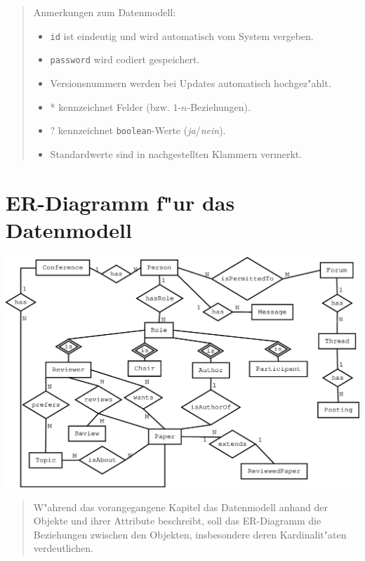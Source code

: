 \documentclass[a4paper, 12pt]{scrartcl}
\begin{document}
    \begin{quote}
        Anmerkungen zum Datenmodell:
        \begin{itemize}
            \item \texttt{id} ist eindeutig und wird automatisch vom System vergeben.
            \item \texttt{password} wird codiert gespeichert.
            \item Versionsnummern werden bei Updates automatisch hochgez"ahlt.
            \item * kennzeichnet Felder (bzw. $1$-$n$-Beziehungen).
            \item ? kennzeichnet \texttt{boolean}-Werte (\textit{ja}/\textit{nein}).
            \item Standardwerte sind in nachgestellten Klammern vermerkt.
        \end{itemize}
    \end{quote}

    \section{ER-Diagramm f"ur das Datenmodell}

    \includegraphics[width=15cm]{er-diagram}

    \begin{quote}
    W"ahrend das vorangegangene Kapitel das Datenmodell anhand der Objekte und ihrer Attribute
    beschreibt, soll das ER-Diagramm die Beziehungen zwischen den Objekten, insbesondere deren
    Kardinalit"aten verdeutlichen.
    \end{quote}

    \newpage
\end{document}
